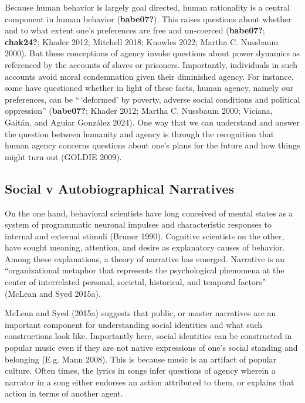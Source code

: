 \documentclass[12pt]{book}
\theoremstyle{definition}
\theoremstyle{remark}
\begin{document}
Because human behavior is largely goal directed, human rationality is a central component in human behavior (\textbf{babe07?}). This raises questions about whether and to what extent one's preferences are free and un-coerced (\textbf{babe07?}; \textbf{chak24?}; Khader 2012; Mitchell 2018; Knowles 2022; Martha C. Nussbaum 2000). But these conceptions of agency invoke questions about power dynamics as referenced by the accounts of slaves or prisoners. Importantly, individuals in such accounts avoid moral condemnation given their diminished agency. For instance, some have questioned whether in light of these facts, human agency, namely our preferences, can be ``\,`deformed' by poverty, adverse social conditions and political oppression'' (\textbf{babe07?}; Khader 2012; Martha C. Nussbaum 2000; Viciana, Gaitán, and Aguiar González 2024). One way that we can understand and answer the question between humanity and agency is through the recognition that human agency concerns questions about one's plans for the future and how things might turn out (GOLDIE 2009).

\subsection*{Social v Autobiographical Narratives}\label{social-v-autobiographical-narratives}

On the one hand, behavioral scientists have long conceived of mental states as a system of programmatic neuronal impulses and characteristic responses to internal and external stimuli (Bruner 1990). Cognitive scientists on the other, have sought meaning, attention, and desire as explanatory causes of behavior. Among these explanations, a theory of narrative has emerged. Narrative is an ``organizational metaphor that represents the psychological phenomena at the center of interrelated personal, societal, historical, and temporal factors'' (McLean and Syed 2015a).

McLean and Syed (2015a) suggests that public, or master narratives are an important component for understanding social identities and what such constructions look like. Importantly here, social identities can be constructed in popular music even if they are not native expressions of one's social standing and belonging (E.g. Mann 2008). This is because music is an artifact of popular culture. Often times, the lyrics in songs infer questions of agency wherein a narrator in a song either endorses an action attributed to them, or explains that action in terms of another agent.
\end{document}
